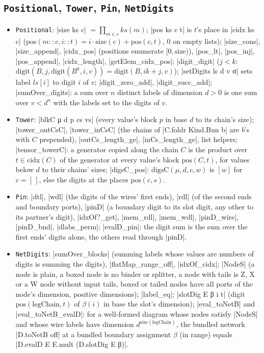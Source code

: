 \subsection{\texttt{Positional}, \texttt{Tower}, \texttt{Pin}, \texttt{NetDigits}}

\begin{itemize}
\item \texttt{Positional}: \lean|size ks c| $=\prod_{m\in c}ks(m)$; \lean|pos ks c t| is $t$'s place
  in \lean|cidx ks c| ($\mathrm{pos}(m{::}c,i{::}t)=i\cdot\mathrm{size}(c)+\mathrm{pos}(c,t)$, $0$ on empty lists);
  \lean|size_cons|, \lean|size_append|, \lean|cidx_pos| (positions enumerate $[0,\mathrm{size})$),
  \lean|pos_lt|, \lean|pos_inj|, \lean|pos_append|, \lean|cidx_length|, \lean|getElem_cidx_pos|;
  \lean|digit_digit| ($j<k$: $\mathrm{digit}(B,j,\mathrm{digit}(B^k,i,v))=\mathrm{digit}(B,ik+j,v)$);
  \lean|setDigits ls d v σ| sets label $ls[i]$ to digit $i$ of $v$; \lean|digit_zero_add|,
  \lean|digit_succ_add|; \lean|sumOver_digits|: a sum over $n$ distinct labels of dimension $d>0$ is
  one sum over $v<d^n$ with the labels set to the digits of $v$.
\item \texttt{Tower}: \lean|blkC μ d p cs vs| (every value's block $p$ in base $d$ to its chain's
  size); \lean|tower_outCsC|, \lean|tower_inCsC| (the chains of \lean|C.foldr Kind.Bun b| are $b$'s with
  $C$ prepended), \lean|outCs_length_ge|, \lean|inCs_length_ge|, list helpers; \lean|tensor_towerC|:
  a generator copied along the chain $C$ is the product over $t\in\mathrm{cidx}(C)$ of the generator at
  every value's block $\mathrm{pos}(C,t)$, for values below $d$ to their chains' sizes; \lean|digsC_pos|:
  $\mathrm{digsC}(\mu,d,c,w)$ is $[w]$ for $c=[\,]$, else the digits at the places $\mathrm{pos}(c,s)$.
\item \texttt{Pin}: \lean|dtl|, \lean|wdl| (the digits of the wires' first ends), \lean|rdl| (of the
  second ends and boundary ports), \lean|pinD| (a boundary digit to its slot digit, any other to its
  partner's digit), \lean|idxOf?_get|, \lean|mem_rdl|, \lean|mem_wdl|, \lean|pinD_wire|,
  \lean|pinD_bnd|, \lean|dlabs_perm|; \lean|evalD_pin|: the digit sum is the sum over the first ends'
  digits alone, the others read through \lean|pinD|.
\item \texttt{NetDigits}: \lean|sumOver_blocks| (summing labels whose values are numbers of digits is
  summing the digits), \lean|flatMap_range_off|, \lean|idxOf_cidx|; \lean|NodeS| (a node is plain, a
  boxed node is no binder or splitter, a node with tails is Z, X or a W node without input tails,
  boxed or tailed nodes have all ports of the node's dimension, positive dimensions);
  \lean|label_eq|; \lean|slotDig E β i t| (digit $\mathrm{pos}(\mathrm{legChain},t)$ of $\beta(i)$ in base the
  slot's dimension); \lean|eval_toNetB| and \lean|eval_toNetB_evalD|: for a well-formed diagram whose
  nodes satisfy \lean|NodeS| and whose wire labels have dimension $d^{\mathrm{size}(\mathrm{legChain})}$, the
  bundled network \lean|D.toNetB off| at a bundled boundary assignment $\beta$ (in range) equals
  \lean|D.evalD E E.mult (D.slotDig E β)|.
\end{itemize}

